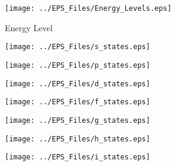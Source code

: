 \documentclass[12pt,a4paper,titlepage]{jarticle}
\begin{document}
\title{}
\author{A8SM2080 Yusa Shusaku}
\date{}
\begin{figure}[H]
\begin{center}
\texttt{[image: ../EPS\_Files/Energy\_Levels.eps]}
\caption{Energy Level}
\end{center}
\end{figure}

\begin{figure}[H]
\begin{center}
\texttt{[image: ../EPS\_Files/s\_states.eps]}
\end{center}
\end{figure}

\begin{figure}[H]
\begin{center}
\texttt{[image: ../EPS\_Files/p\_states.eps]}
\end{center}
\end{figure}

\begin{figure}[H]
\begin{center}
\texttt{[image: ../EPS\_Files/d\_states.eps]}
\end{center}
\end{figure}

\begin{figure}[H]
\begin{center}
\texttt{[image: ../EPS\_Files/f\_states.eps]}
\end{center}
\end{figure}

\begin{figure}[H]
\begin{center}
\texttt{[image: ../EPS\_Files/g\_states.eps]}
\end{center}
\end{figure}

\begin{figure}[H]
\begin{center}
\texttt{[image: ../EPS\_Files/h\_states.eps]}
\end{center}
\end{figure}

\begin{figure}[H]
\begin{center}
\texttt{[image: ../EPS\_Files/i\_states.eps]}
\end{center}
\end{figure}
\end{document}
